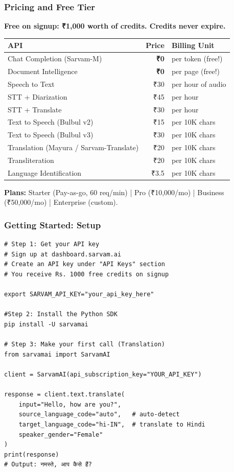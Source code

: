 \begin{frame}[fragile]\frametitle{Pricing and Free Tier}
\textbf{Free on signup: ₹1,000 worth of credits. Credits never expire.}

\begin{center}
\begin{tabular}{|l|r|l|}
\hline
\textbf{API} & \textbf{Price} & \textbf{Billing Unit} \\
\hline
Chat Completion (Sarvam-M) & \textbf{₹0} & per token (free!) \\
Document Intelligence & \textbf{₹0} & per page (free!) \\
\hline
Speech to Text & ₹30 & per hour of audio \\
STT + Diarization & ₹45 & per hour \\
STT + Translate & ₹30 & per hour \\
\hline
Text to Speech (Bulbul v2) & ₹15 & per 10K chars \\
Text to Speech (Bulbul v3) & ₹30 & per 10K chars \\
\hline
Translation (Mayura / Sarvam-Translate) & ₹20 & per 10K chars \\
Transliteration & ₹20 & per 10K chars \\
Language Identification & ₹3.5 & per 10K chars \\
\hline
\end{tabular}
\end{center}

\textbf{Plans:} Starter (Pay-as-go, 60 req/min) | Pro (₹10,000/mo) | Business (₹50,000/mo) | Enterprise (custom).
\end{frame}

\begin{frame}[fragile]\frametitle{Getting Started: Setup}


\begin{lstlisting}
# Step 1: Get your API key
# Sign up at dashboard.sarvam.ai
# Create an API key under "API Keys" section
# You receive Rs. 1000 free credits on signup

export SARVAM_API_KEY="your_api_key_here"

#Step 2: Install the Python SDK
pip install -U sarvamai

# Step 3: Make your first call (Translation)
from sarvamai import SarvamAI

client = SarvamAI(api_subscription_key="YOUR_API_KEY")

response = client.text.translate(
    input="Hello, how are you?",
    source_language_code="auto",   # auto-detect
    target_language_code="hi-IN",  # translate to Hindi
    speaker_gender="Female"
)
print(response)
# Output: नमस्ते, आप कैसे हैं?
\end{lstlisting}

\end{frame}

